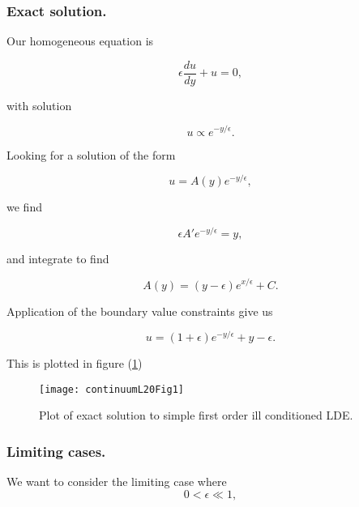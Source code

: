 \subsubsection{Exact solution.}

Our homogeneous equation is

\begin{equation}\label{eqn:continuumL20:370}
\epsilon \frac{du}{dy} + u = 0,
\end{equation}

with solution

\begin{equation}\label{eqn:continuumL20:390}
u \propto e^{-y/\epsilon}.
\end{equation}

Looking for a solution of the form

\begin{equation}\label{eqn:continuumL20:410}
u = A(y) e^{-y/\epsilon},
\end{equation}

we find

\begin{equation}\label{eqn:continuumL20:430}
\epsilon A' e^{-y/\epsilon} = y,
\end{equation}

and integrate to find

\begin{equation}\label{eqn:continuumL20:450}
A(y) = (y - \epsilon) e^{x/\epsilon} + C.
\end{equation}

Application of the boundary value constraints give us

\begin{equation}\label{eqn:continuumL20:50}
u = ( 1 + \epsilon ) e^{-y/\epsilon} + y - \epsilon.
\end{equation}

This is plotted in figure (\ref{fig:continuumL20:continuumL20Fig1})
\begin{figure}[htp]
   \centering
   \texttt{[image: continuumL20Fig1]}
   \caption{Plot of exact solution to simple first order ill conditioned LDE.}\label{fig:continuumL20:continuumL20Fig1}
\end{figure}

\subsubsection{Limiting cases.}

We want to consider the limiting case where
\begin{equation}\label{eqn:continuumL20:70}
0 < \epsilon \ll 1,
\end{equation}

